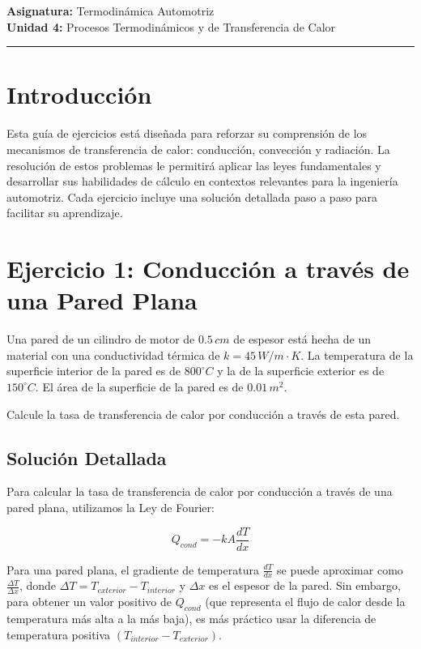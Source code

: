 \documentclass{article}
\begin{document}

\textbf{Asignatura:} Termodinámica Automotriz \\
\textbf{Unidad 4:} Procesos Termodinámicos y de Transferencia de Calor

\vspace{5mm}
\hrule
\vspace{5mm}

\section*{Introducción}

Esta guía de ejercicios está diseñada para reforzar su comprensión de los mecanismos de transferencia de calor: conducción, convección y radiación. La resolución de estos problemas le permitirá aplicar las leyes fundamentales y desarrollar sus habilidades de cálculo en contextos relevantes para la ingeniería automotriz. Cada ejercicio incluye una solución detallada paso a paso para facilitar su aprendizaje.

\section*{Ejercicio 1: Conducción a través de una Pared Plana}

Una pared de un cilindro de motor de $0.5 \, cm$ de espesor está hecha de un material con una conductividad térmica de $k = 45 \, W/m \cdot K$. La temperatura de la superficie interior de la pared es de $800^\circ C$ y la de la superficie exterior es de $150^\circ C$. El área de la superficie de la pared es de $0.01 \, m^2$.

Calcule la tasa de transferencia de calor por conducción a través de esta pared.

\subsection*{Solución Detallada}

Para calcular la tasa de transferencia de calor por conducción a través de una pared plana, utilizamos la Ley de Fourier:

$$ Q_{cond} = -k A \frac{dT}{dx} $$

Para una pared plana, el gradiente de temperatura $\frac{dT}{dx}$ se puede aproximar como $\frac{\Delta T}{\Delta x}$, donde $\Delta T = T_{exterior} - T_{interior}$ y $\Delta x$ es el espesor de la pared. Sin embargo, para obtener un valor positivo de $Q_{cond}$ (que representa el flujo de calor desde la temperatura más alta a la más baja), es más práctico usar la diferencia de temperatura positiva $(T_{interior} - T_{exterior})$.
\end{document}
